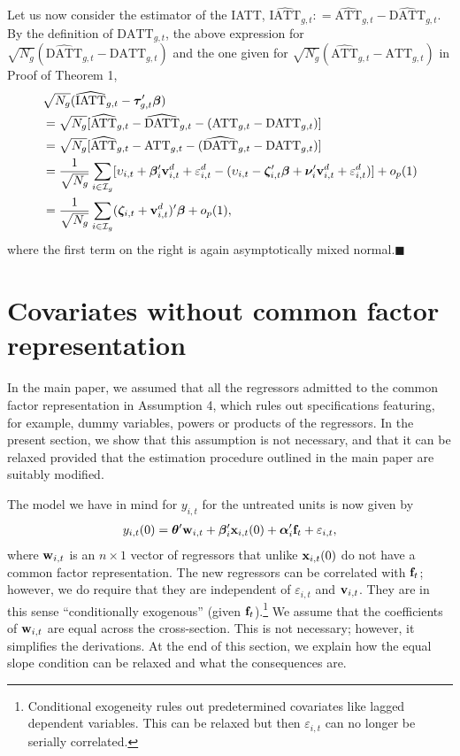 \documentclass[12pt,fleqn]{article}
\begin{document}
Let us now consider the estimator of the IATT, $\widehat{\mathrm{IATT}}_{g,t}: = \widehat{\mathrm{ATT}}_{g,t}-\widehat{\mathrm{DATT}}_{g,t}$. By the definition of $\mathrm{DATT}_{g,t}$, the above expression for $\sqrt{N_g}(\widehat{\mathrm{DATT}}_{g,t} - \mathrm{DATT}_{g,t})$ and the one given for $\sqrt{N_g}(\widehat{\mathrm{ATT}}_{g,t} - \mathrm{ATT}_{g,t})$ in Proof of Theorem 1,
\begin{align}
& \sqrt{N_g}(\widehat{\mathrm{IATT}}_{g,t} - \boldsymbol{\tau}_{g,t}' \boldsymbol{\beta}) \notag\\
& = \sqrt{N_g}[\widehat{\mathrm{ATT}}_{g,t}-\widehat{\mathrm{DATT}}_{g,t} - (\mathrm{ATT}_{g,t} - \mathrm{DATT}_{g,t})] \notag\\
& = \sqrt{N_g}[\widehat{\mathrm{ATT}}_{g,t} - \mathrm{ATT}_{g,t} -(\widehat{\mathrm{DATT}}_{g,t} - \mathrm{DATT}_{g,t})] \notag\\
& = \frac{1}{\sqrt{N_g}} \sum_{i\in \mathcal{I}_g} [\upsilon_{i,t}  + \boldsymbol{\beta}_i'\mathbf{v}_{i,t}^d + \varepsilon_{i,t}^d  - (\upsilon_{i,t} - \boldsymbol{\zeta}_{i,t}'\boldsymbol{\beta} + \boldsymbol{\nu}_i'\mathbf{v}_{i,t}^d + \varepsilon_{i,t}^d )] + o_p(1) \notag\\
& = \frac{1}{\sqrt{N_g}} \sum_{i\in \mathcal{I}_g} (\boldsymbol{\zeta}_{i,t} + \mathbf{v}_{i,t}^d)'\boldsymbol{\beta} + o_p(1),
\end{align}
where the first term on the right is again asymptotically mixed normal.\hfill{$\blacksquare$}

\section{Covariates without common factor representation}

In the main paper, we assumed that all the regressors admitted to the common factor representation in Assumption 4, which rules out specifications featuring, for example, dummy variables, powers or products of the regressors. In the present section, we show that this assumption is not necessary, and that it can be relaxed provided that the estimation procedure outlined in the main paper are suitably modified.

The model we have in mind for $y_{i,t}$ for the untreated units is now given by
\begin{align}
y_{i,t}(0) = \boldsymbol{\theta}'\mathbf{w}_{i,t} + \boldsymbol{\beta}_i'\mathbf{x}_{i,t}(0) + \boldsymbol{\alpha}_i'\mathbf{f}_t + \varepsilon_{i,t} ,
\end{align}
where $\mathbf{w}_{i,t}$ is an $n\times 1$ vector of regressors that unlike $\mathbf{x}_{i,t}(0)$ do not have a common factor representation. The new regressors can be correlated with $\mathbf{f}_t$; however, we do require that they are independent of $\varepsilon_{i,t}$ and $\mathbf{v}_{i,t}$. They are in this sense ``conditionally exogenous'' (given $\mathbf{f}_t$).\footnote{Conditional exogeneity rules out predetermined covariates like lagged dependent variables. This can be relaxed but then $\varepsilon_{i,t}$ can no longer be serially correlated.} We assume that the coefficients of $\mathbf{w}_{i,t}$ are equal across the cross-section. This is not necessary; however, it simplifies the derivations. At the end of this section, we explain how the equal slope condition can be relaxed and what the consequences are.
\end{document}
